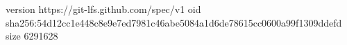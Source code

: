 version https://git-lfs.github.com/spec/v1
oid sha256:54d12cc1e448c8e9e7ed7981c46abe5084a1d6de78615cc0600a99f1309ddefd
size 6291628
